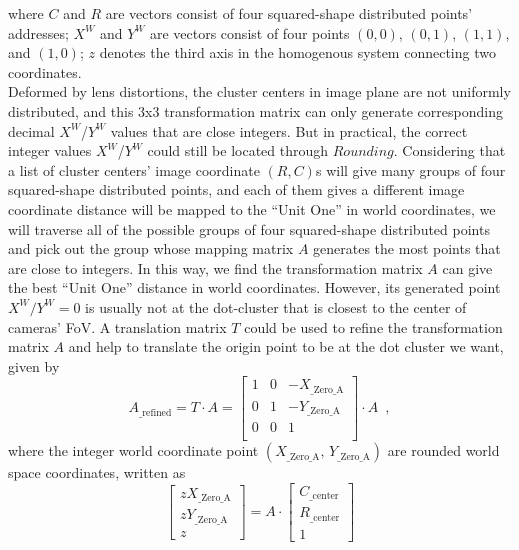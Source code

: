 %
\noindent
where \(C\) and \(R\) are vectors consist of four squared-shape distributed points' addresses; \(X^W\) and \(Y^W\) are vectors consist of four points \((0, 0)\), \((0, 1)\), \((1, 1)\), and \((1, 0)\); \(z\) denotes the third axis in the homogenous system connecting two coordinates. %
\\\indent%
Deformed by lens distortions, the cluster centers in image plane are not uniformly distributed, and this 3x3 transformation matrix can only generate corresponding decimal \(X^W\)/\(Y^W\) values that are close integers. But in practical, the correct integer values \(X^W\)/\(Y^W\) could still be located through \(Rounding\). Considering that a list of cluster centers' image coordinate \((R, C)\)s will give many groups of four squared-shape distributed points, and each of them gives a different image coordinate distance will be mapped to the \enquote{Unit One} in world coordinates, we will traverse all of the possible groups of four squared-shape distributed points and pick out the group whose mapping matrix \(A\) generates the most points that are close to integers. %
%
In this way, we find the transformation matrix \(A\) can give the best \enquote{Unit One} distance in world coordinates. However, its generated point \(X^W/Y^W = 0\) is usually not at the dot-cluster that is closest to the center of cameras' FoV. A translation matrix \(T\) could be used to refine the transformation matrix \(A\) and help to translate the origin point to be at the dot cluster we want, given by%
%
\begin{equation}
%
A_{\text{\_refined}}%
= %
T \cdot A %
= %
\begin{bmatrix} 
1 & 0 & -X_{\text{\_Zero\_A}} \\%
0 & 1 & -Y_{\text{\_Zero\_A}} \\%
0 & 0 &   1 \\%
\end{bmatrix}%
\cdot A%
\, \, \, ,%
\end{equation}%
%
where the integer world coordinate point \((X_{\text{\_Zero\_A}}, \, Y_{\text{\_Zero\_A}})\) are rounded world space coordinates, written as%
%
\begin{equation}
%
\left[ \begin{array}{c} %
zX_{\text{\_Zero\_A}} \\ zY_{\text{\_Zero\_A}} \\ z \end{array} \right] %
= %
A\cdot \left[ \begin{array}{c} %
C_{\text{\_center}} \\ R_{\text{\_center}} \\ 1 \end{array} \right] %
%
\end{equation}%
